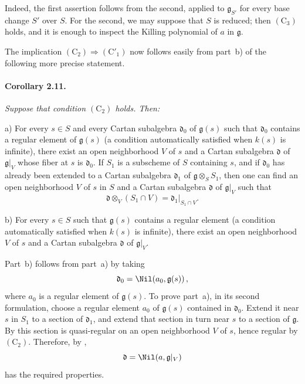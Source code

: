 Indeed, the first assertion follows from the second, applied to
\(\mathfrak g_{S'}\) for every base change \(S'\) over \(S\). For
the second, we may suppose that \(S\) is reduced; then
\((\mathrm C_3)\) holds, and it is enough to inspect the Killing
polynomial of \(a\) in \(\mathfrak g\).

The implication
\((\mathrm C_2)\Longrightarrow(\mathrm C'_1)\) now follows easily
from part~b) of the following more precise statement.

\paragraph{\textbf{Corollary 2.11.}}
{\itshape Suppose that condition \((\mathrm C_2)\) holds. Then:

\smallskip
\noindent
\textup{a)}
For every \(s\in S\) and every Cartan subalgebra
\(\mathfrak d_0\) of \(\mathfrak g(s)\) such that
\(\mathfrak d_0\) contains a regular element of \(\mathfrak g(s)\)
\textup{(a condition automatically satisfied when \(k(s)\) is
infinite)}, there exist an open neighborhood \(V\) of \(s\) and a
Cartan subalgebra \(\mathfrak d\) of \(\mathfrak g|_V\) whose fiber
at \(s\) is \(\mathfrak d_0\). If \(S_1\) is a subscheme of \(S\)
containing \(s\), and if \(\mathfrak d_0\) has already been
extended to a Cartan subalgebra \(\mathfrak d_1\) of
\(\mathfrak g\otimes_S S_1\), then one can find an open
neighborhood \(V\) of \(s\) in \(S\) and a Cartan subalgebra
\(\mathfrak d\) of \(\mathfrak g|_V\) such that
\[
  \mathfrak d\otimes_V(S_1\cap V)
  =\mathfrak d_1|_{S_1\cap V}.
\]

\smallskip
\noindent
\textup{b)}
For every \(s\in S\) such that \(\mathfrak g(s)\) contains a
regular element \textup{(a condition automatically satisfied when
\(k(s)\) is infinite)}, there exist an open neighborhood \(V\) of
\(s\) and a Cartan subalgebra \(\mathfrak d\) of
\(\mathfrak g|_V\).}

Part~b) follows from part~a) by taking
\[
  \mathfrak d_0=\Nil\!\left(a_0,\mathfrak g(s)\right),
\]
where \(a_0\) is a regular element of \(\mathfrak g(s)\).
To prove part~a), in its second formulation, choose a regular
element \(a_0\) of \(\mathfrak g(s)\) contained in
\(\mathfrak d_0\). Extend it near \(s\) in \(S_1\) to a section of
\(\mathfrak d_1\), and extend that section in turn near \(s\) to a
section of \(\mathfrak g\). By  this section is quasi-regular
on an open neighborhood \(V\) of \(s\), hence regular by
\((\mathrm C_2)\). Therefore, by ,
\[
  \mathfrak d=\Nil\!\left(a,\mathfrak g|_V\right)
\]
has the required properties.
